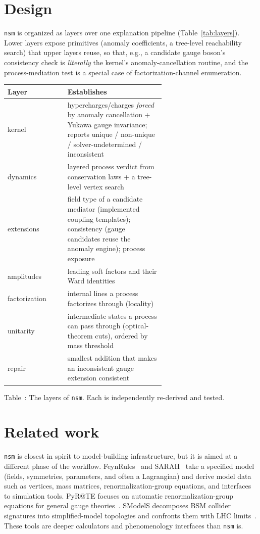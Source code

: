 \documentclass[11pt]{article}
\newcommand{\nsm}{\texttt{nsm}}
\begin{document}
\section{Design}

\nsm{} is organized as layers over one explanation pipeline
(Table~\ref{tab:layers}). Lower layers expose primitives (anomaly coefficients,
a tree-level reachability search) that upper layers reuse, so that, e.g., a
candidate gauge boson's consistency check is \emph{literally} the kernel's
anomaly-cancellation routine, and the process-mediation test is a special case
of factorization-channel enumeration.

\begin{center}
\centering
\small
\begin{tabular}{@{}lp{0.62\linewidth}@{}}
\toprule
Layer & Establishes \\
\midrule
kernel & hypercharges/charges \emph{forced} by anomaly cancellation + Yukawa
gauge invariance; reports unique / non-unique / solver-undetermined / inconsistent \\
dynamics & layered process verdict from conservation laws + a tree-level vertex
search \\
extensions & field type of a candidate mediator (implemented coupling templates);
consistency (gauge candidates reuse the anomaly engine); process exposure \\
amplitudes & leading soft factors and their Ward identities \\
factorization & internal lines a process factorizes through (locality) \\
unitarity & intermediate states a process can pass through (optical-theorem
cuts), ordered by mass threshold \\
repair & smallest addition that makes an inconsistent gauge extension consistent \\
\bottomrule
\end{tabular}
\par\medskip
{}\label{tab:layers}
Table~\thetable: The layers of \nsm. Each is independently re-derived and tested.
\end{center}

\section{Related work}

\nsm{} is closest in spirit to model-building infrastructure, but it is aimed
at a different phase of the workflow. FeynRules~\cite{feynrules2} and
SARAH~\cite{sarah4} take a specified model (fields, symmetries, parameters,
and often a Lagrangian) and derive model data such as vertices, mass matrices,
renormalization-group equations, and interfaces to simulation tools. PyR@TE
focuses on automatic renormalization-group equations for general gauge
theories~\cite{pyrate}. SModelS decomposes BSM collider signatures into
simplified-model topologies and confronts them with LHC limits~\cite{smodels}.
These tools are deeper calculators and phenomenology interfaces than \nsm{} is.
\end{document}
